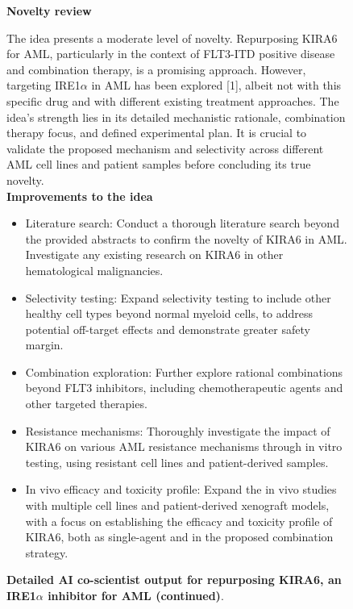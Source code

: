 \begin{figure}[htbp!]
\begin{tcolorbox}[
    colback=black!5!white,
    colframe=black!60!white,
    title=\textbf{KIRA6 for AML (continued)},
    fonttitle=\bfseries,
    arc=3mm,
    boxrule=1pt,
    bottomrule=2pt,
]
\textbf{Novelty review}

The idea presents a moderate level of novelty. Repurposing KIRA6 for AML, particularly in the context of FLT3-ITD positive disease and combination therapy, is a promising approach. However, targeting IRE1$\alpha$ in AML has been explored [1], albeit not with this specific drug and with different existing treatment approaches.  The idea's strength lies in its detailed mechanistic rationale, combination therapy focus, and defined experimental plan.  It is crucial to validate the proposed mechanism and selectivity across different AML cell lines and patient samples before concluding its true novelty. \\

\textbf{Improvements to the idea}
\begin{itemize}
    \item Literature search: Conduct a thorough literature search beyond the provided abstracts to confirm the novelty of KIRA6 in AML. Investigate any existing research on KIRA6 in other hematological malignancies.
    \item Selectivity testing:  Expand selectivity testing to include other healthy cell types beyond normal myeloid cells, to address potential off-target effects and demonstrate greater safety margin.
    \item Combination exploration: Further explore rational combinations beyond FLT3 inhibitors, including chemotherapeutic agents and other targeted therapies.
    \item Resistance mechanisms:  Thoroughly investigate the impact of KIRA6 on various AML resistance mechanisms through in vitro testing, using resistant cell lines and patient-derived samples.
    \item In vivo efficacy and toxicity profile: Expand the in vivo studies with multiple cell lines and patient-derived xenograft models, with a focus on establishing the efficacy and toxicity profile of KIRA6, both as single-agent and in the proposed combination strategy.
\end{itemize}

\end{tcolorbox}
\vspace{0.1cm}
\caption{\textbf{Detailed AI co-scientist output for repurposing KIRA6, an IRE1$\alpha$ inhibitor for AML (continued)}.}
\label{fig:ex_kira6_7}
\end{figure}


